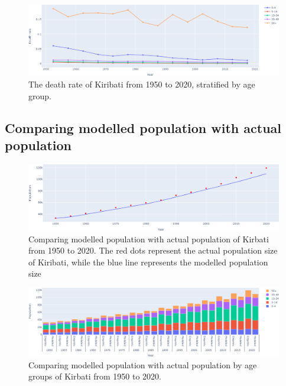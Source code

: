 \documentclass{article}
\begin{document}
\begin{figure}[!htp]
   \centerline{\includegraphics[width=\textwidth,keepaspectratio]{images/cdr.png}}
    \caption{The death rate of Kiribati from 1950 to 2020, stratified by age group.}
    \label{fig:cdr}
\end{figure}

\subsection{Comparing modelled population with actual population}
\begin{figure}[!htp]
    \centerline{\includegraphics[width=\textwidth,keepaspectratio]{images/modelled_total.png}}
    \caption{Comparing modelled population with actual population of Kirbati from 1950 to 2020. The red dots represent the actual population size of Kiribati,
     while the blue line represents the modelled population size}
    \label{fig:modelled_total}
\end{figure}

\begin{figure}[htp]
    \centerline{\includegraphics[width=\textwidth,keepaspectratio]{images/compare_pop.png}}
    \caption{Comparing modelled population with actual population by age groups of Kirbati from 1950 to 2020.}
    \label{fig:compare_group}
\end{figure}

\newpage    
\printbibliography
\end{document}
